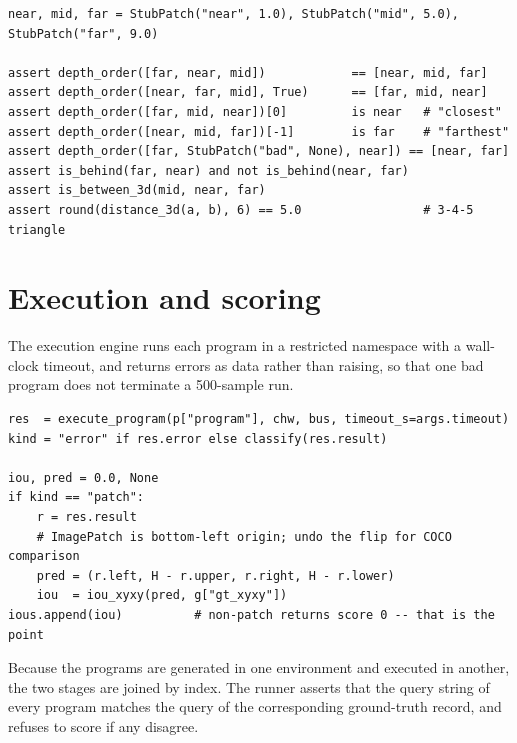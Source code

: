 \documentclass[12pt,a4paper,oneside]{report}
\begin{document}
\begin{lstlisting}[caption={Representative assertions from
\texttt{test\_depth\_api.py}. A failure here means the sign or the ordering has
flipped, and is visible immediately rather than after hours of debugging.}]
near, mid, far = StubPatch("near", 1.0), StubPatch("mid", 5.0), StubPatch("far", 9.0)

assert depth_order([far, near, mid])            == [near, mid, far]
assert depth_order([near, far, mid], True)      == [far, mid, near]
assert depth_order([far, mid, near])[0]         is near   # "closest"
assert depth_order([near, mid, far])[-1]        is far    # "farthest"
assert depth_order([far, StubPatch("bad", None), near]) == [near, far]
assert is_behind(far, near) and not is_behind(near, far)
assert is_between_3d(mid, near, far)
assert round(distance_3d(a, b), 6) == 5.0                 # 3-4-5 triangle
\end{lstlisting}

\section{Execution and scoring}

The execution engine runs each program in a restricted namespace with a wall-clock
timeout, and returns errors as data rather than raising, so that one bad program does
not terminate a 500-sample run.

\begin{lstlisting}[caption={Scoring, from \texttt{eval/execute\_refcoco.py}. A non-patch
return scores zero rather than being excluded --- returning a sentence where a box is
required is a task failure, and dropping such cases would flatter the baseline.}]
res  = execute_program(p["program"], chw, bus, timeout_s=args.timeout)
kind = "error" if res.error else classify(res.result)

iou, pred = 0.0, None
if kind == "patch":
    r = res.result
    # ImagePatch is bottom-left origin; undo the flip for COCO comparison
    pred = (r.left, H - r.upper, r.right, H - r.lower)
    iou  = iou_xyxy(pred, g["gt_xyxy"])
ious.append(iou)          # non-patch returns score 0 -- that is the point
\end{lstlisting}

Because the programs are generated in one environment and executed in another, the two
stages are joined by index. The runner asserts that the query string of every program
matches the query of the corresponding ground-truth record, and refuses to score if any
disagree.
\end{document}
